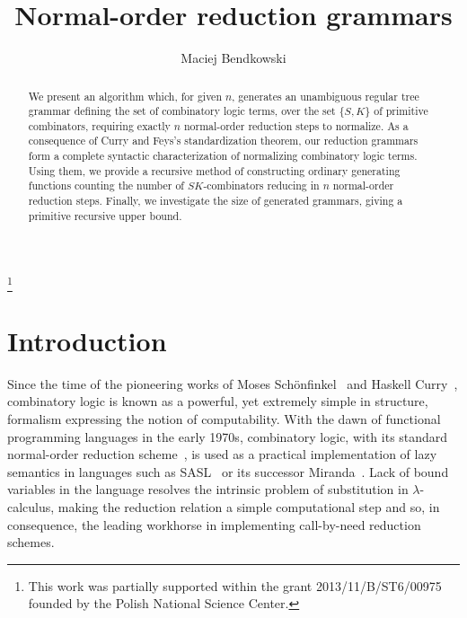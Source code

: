 \documentclass[11pt,a4paper]{amsart}
\theoremstyle{definition}
\begin{document}
\title{Normal-order reduction grammars}
\author{Maciej Bendkowski}
\address{
  Theoretical Computer Science Department\\
  Faculty of Mathematics and Computer Science\\
  Jagiellonian University\\
  ul. Prof. {\L}ojasiewicza 6, 30-348 Krak\'ow, Poland}
\thanks{This work was partially supported within the grant 2013/11/B/ST6/00975
            founded by the Polish National Science Center.} 

\maketitle

\begin{abstract}
We present an algorithm which, for given $n$, generates an unambiguous regular tree grammar defining the set of combinatory logic terms, over the set $\{S,K\}$ of primitive combinators, requiring exactly $n$ normal-order reduction steps to normalize. As a consequence of Curry and Feys's standardization theorem, our reduction grammars form a complete syntactic characterization of normalizing combinatory logic terms. Using them, we provide a recursive method of constructing ordinary generating functions counting the number of $S K$-combinators reducing in $n$ normal-order reduction steps. Finally, we investigate the size of generated grammars, giving a primitive recursive upper bound.
\end{abstract}

\section{Introduction}

Since the time of the pioneering works of Moses Schönfinkel~\cite{schonfinkel} and Haskell Curry~\cite{curry}, combinatory logic is known as a powerful, yet extremely simple in structure, formalism expressing the notion of computability. With the dawn of functional programming languages in the early 1970s,
combinatory logic, with its standard normal-order reduction scheme~\cite{curry-feys1958}, is used as a practical implementation of
lazy semantics in languages such as SASL~\cite{turner1979} or its successor
Miranda~\cite{turner1986}. Lack of bound variables in the language resolves
the intrinsic problem of substitution in \mbox{$\lambda$-calculus}, making the reduction relation a simple computational step and so, in consequence, the leading workhorse in implementing call-by-need reduction schemes.
\end{document}

